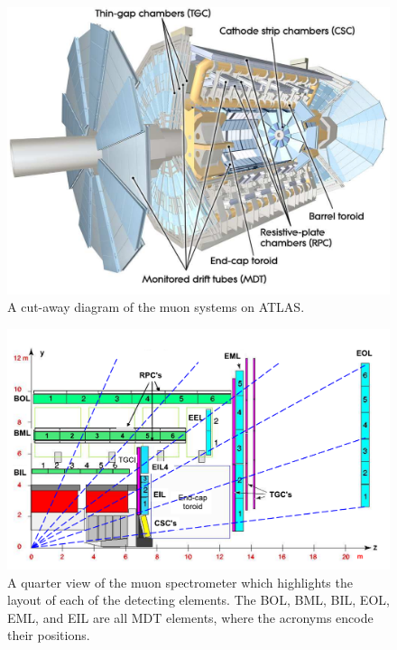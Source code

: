 \begin{figure}[hbtp]
\includegraphics[width=\fullfig]{figures/muon_overview.pdf}
\caption{A cut-away diagram of the muon systems on \ac{ATLAS}.}
\label{fig:muon_overview}
\end{figure}

\begin{figure}[hbtp]
\includegraphics[width=\fullfig]{figures/muon_side_schematic.pdf}
\caption{A quarter view of the muon spectrometer which highlights the layout of each of the detecting elements. The BOL, BML, BIL, EOL, EML, and EIL are all \ac{MDT} elements, where the acronyms encode their positions.}
\label{fig:muon_side_schematic}
\end{figure}

